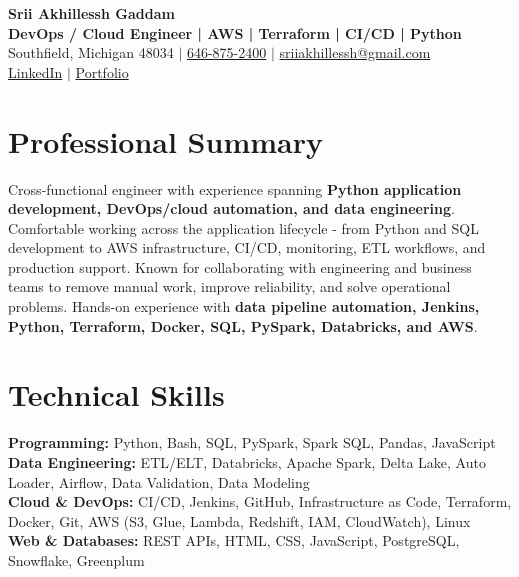 \documentclass[letterpaper,10pt]{article}
\begin{document}
\fontsize{9.35pt}{10.45pt}\selectfont

\begin{center}
    {\LARGE \textbf{Srii Akhillessh Gaddam}} \\[-1pt]
    \textbf{DevOps / Cloud Engineer | AWS | Terraform | CI/CD | Python} \\[2pt]
    Southfield, Michigan 48034 $|$
    \href{tel:6468752400}{646-875-2400} $|$
    \href{mailto:sriiakhillessh@gmail.com}{sriiakhillessh@gmail.com} \\[1pt]
    \href{https://www.linkedin.com/in/srii-akhiilessh-gaddam-b48668191/}{LinkedIn} $|$
    \href{https://sriiakhillesshg.github.io/portfolio/}{Portfolio}
\end{center}
\vspace{-8pt}

\section{Professional Summary}
\small{Cross-functional engineer with experience spanning \textbf{Python application development, DevOps/cloud automation, and data engineering}. Comfortable working across the application lifecycle - from Python and SQL development to AWS infrastructure, CI/CD, monitoring, ETL workflows, and production support. Known for collaborating with engineering and business teams to remove manual work, improve reliability, and solve operational problems. Hands-on experience with \textbf{data pipeline automation, Jenkins, Python, Terraform, Docker, SQL, PySpark, Databricks, and AWS}.}

\section{Technical Skills}
\small{
\textbf{Programming:} Python, Bash, SQL, PySpark, Spark SQL, Pandas, JavaScript \\
\textbf{Data Engineering:} ETL/ELT, Databricks, Apache Spark, Delta Lake, Auto Loader, Airflow, Data Validation, Data Modeling \\
\textbf{Cloud \& DevOps:} CI/CD, Jenkins, GitHub, Infrastructure as Code, Terraform, Docker, Git, AWS (S3, Glue, Lambda, Redshift, IAM, CloudWatch), Linux \\
\textbf{Web \& Databases:} REST APIs, HTML, CSS, JavaScript, PostgreSQL, Snowflake, Greenplum
}
\end{document}

